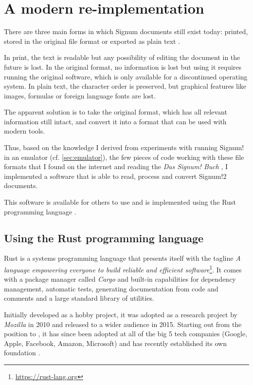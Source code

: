 \section{A modern re-implementation}

There are three main forms in which Signum documents still exist today: printed, stored in the original file format or exported as plain text \cite{xchem2001atari}.

In print, the text is readable but any possibility of editing the document in the future is lost. In the original format, no information is lost but using it requires running the original software, which is only available for a discontinued operating system. In plain text, the character order is preserved, but graphical features like images, formulas or foreign language fonts are lost.

The apparent solution is to take the original format, which has all relevant information still intact, and convert it into a format that can be used with modern tools.

Thus, based on the knowledge I derived from experiments with running Signum! in an emulator (cf. \autoref{sec:emulator}), the few pieces of code working with these file formats that I found on the internet and reading the \textit{Das Signum! Buch} \cite{ritzhaupt1988signum}, I implemented a software that is able to read, process and convert Signum!2 documents.

This software is available for others to use and is implemented using the Rust programming language \cite{xipho2020sdotool}.

\subsection{Using the Rust programming language}

Rust is a systems programming language that presents itself with the tagline \textit{A language empowering everyone to build reliable and efficient software}\footnote{\url{https://rust-lang.org}}. It comes with a package manager called \textit{Cargo} and built-in capabilities for dependency management, automatic tests, generating documentation from code and comments and a large standard library of utilities.

Initially developed as a hobby project, it was adopted as a research project by \textit{Mozilla} in 2010 and released to a wider audience in 2015. Starting out from the position to  \cites{rustNothingNew, rustRefInfluences}, it has since been adopted at all of the big 5 tech companies (Google, Apple, Facebook, Amazon, Microsoft) and has recently established its own foundation \cite{mzla2021rustfoundation}.

